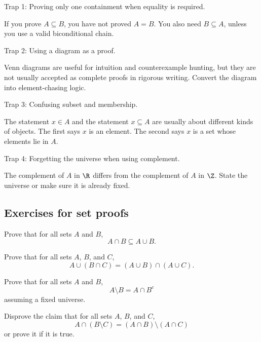\begin{trapbox}
Trap 1: Proving only one containment when equality is required.

If you prove $A\subseteq B$, you have not proved $A=B$. You also need $B\subseteq A$, unless you use a valid biconditional chain.
\end{trapbox}

\begin{trapbox}
Trap 2: Using a diagram as a proof.

Venn diagrams are useful for intuition and counterexample hunting, but they are not usually accepted as complete proofs in rigorous writing. Convert the diagram into element-chasing logic.
\end{trapbox}

\begin{trapbox}
Trap 3: Confusing subset and membership.

The statement $x\in A$ and the statement $x\subseteq A$ are usually about different kinds of objects. The first says $x$ is an element. The second says $x$ is a set whose elements lie in $A$.
\end{trapbox}

\begin{trapbox}
Trap 4: Forgetting the universe when using complement.

The complement of $A$ in $\R$ differs from the complement of $A$ in $\Z$. State the universe or make sure it is already fixed.
\end{trapbox}

\subsection{Exercises for set proofs}

\begin{exercise}
Prove that for all sets $A$ and $B$,
\[
A\cap B\subseteq A\cup B.
\]
\end{exercise}

\begin{exercise}
Prove that for all sets $A$, $B$, and $C$,
\[
A\cup(B\cap C)=(A\cup B)\cap(A\cup C).
\]
\end{exercise}

\begin{exercise}
Prove that for all sets $A$ and $B$,
\[
A\setminus B=A\cap B^c
\]
assuming a fixed universe.
\end{exercise}

\begin{exercise}
Disprove the claim that for all sets $A$, $B$, and $C$,
\[
A\cap(B\setminus C)=(A\cap B)\setminus(A\cap C)
\]
or prove it if it is true.
\end{exercise}

